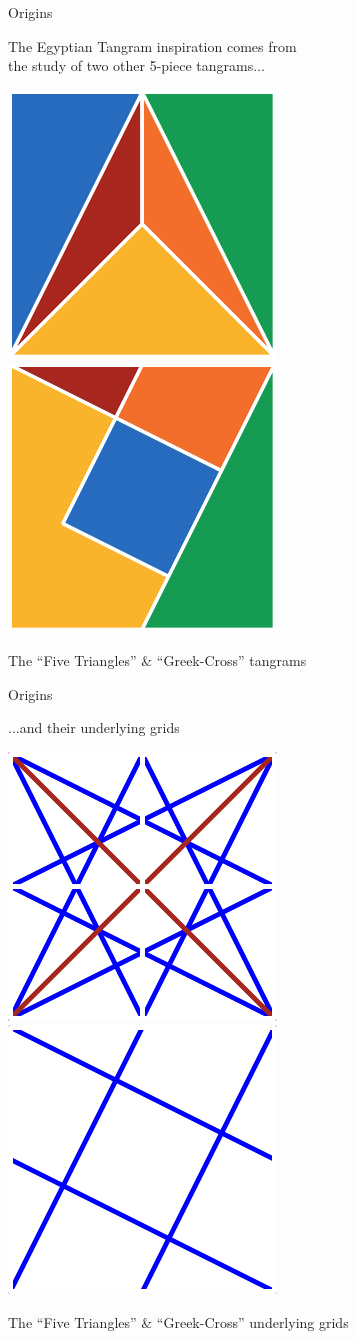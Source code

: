 \documentclass[14pt]{beamer}
\begin{document}
    \begin{frame}{Origins}
        \begin{center}
            The Egyptian Tangram inspiration comes from\\the study of two other 5-piece tangrams...

            \bigskip
        
            \includegraphics[height=18ex]{figures/figure000a.pdf} \qquad \includegraphics[height=18ex]{figures/figure000b.pdf} \\

            \bigskip

            {\small The ``Five Triangles'' \& ``Greek-Cross'' tangrams}
        \end{center}
    \end{frame}


    \begin{frame}{Origins}
        \begin{center}
            ...and their underlying grids\\\phantom{the study of two other 5-piece tangrams...}

            \bigskip 
        
            \includegraphics[height=18ex]{figures/figure000d.pdf} \qquad \includegraphics[height=18ex]{figures/figure000c.pdf} \\
        
            \bigskip

            {\small The ``Five Triangles'' \& ``Greek-Cross'' underlying grids}
        \end{center}
    \end{frame}
\end{document}
